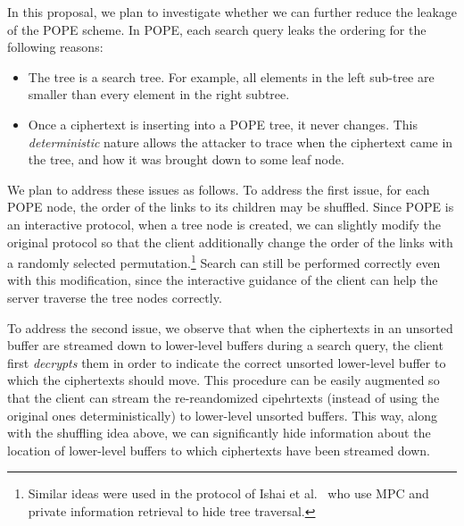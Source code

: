 In this proposal, we plan to investigate whether we can further reduce the
leakage of the POPE scheme. 
%
In POPE, each search query leaks the ordering  for the following reasons: 
\begin{itemize}\setlength\itemsep{0em}
\item The tree is a search tree. For example, all elements in the
  left sub-tree are smaller than every element in the right subtree.
\item Once a ciphertext is inserting into a POPE tree, it never changes. This {\em
  deterministic} nature allows the attacker to trace when the ciphertext came
  in the tree, and how it was brought down to some leaf node.  
\end{itemize}

We plan to address these issues as follows. To address the first issue, for
each POPE node, the order of the links to its children may be shuffled. Since
POPE is an interactive protocol, when a tree node is created, we can slightly
modify the original protocol so that the client additionally change the order
of the links with a randomly selected permutation.\footnote{Similar ideas were used in the protocol of Ishai et al.~\cite{RSA:IKLO16} who use MPC and private information retrieval to hide tree traversal.}
%
Search can still be performed correctly even with this
modification, since the interactive guidance of the client can help the server
traverse the tree nodes correctly. 
    
To address the second issue, we observe that when the ciphertexts in an
unsorted buffer are streamed down to lower-level buffers during a search query,
the client first {\em decrypts} them in order to indicate the correct unsorted
lower-level buffer to which the ciphertexts should move. This procedure can be
easily augmented so that the client can stream the {re-reandomized cipehrtexts}
(instead of using the original ones deterministically) to lower-level unsorted
buffers. This way, along with the shuffling idea above, we can significantly
hide information about the location of lower-level buffers to which ciphertexts
have been streamed down. 


